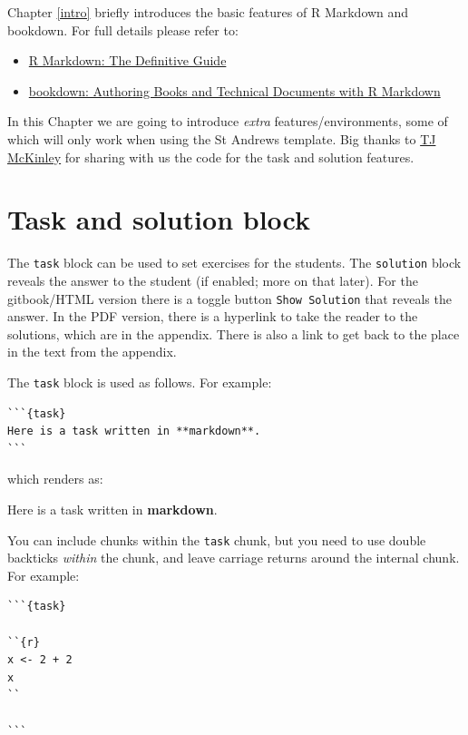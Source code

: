 \documentclass[
  british,
  oneside]{krantz}
\providecommand{\tightlist}{%
  \setlength{\itemsep}{0pt}\setlength{\parskip}{0pt}}
\newcommand{\bblockT}[2][Task]{\begin{tcolorbox}[title = #1 #2, parbox = false]}
\newcommand{\eblockT}{\end{tcolorbox}}
\theoremstyle{definition}
\theoremstyle{definition}
\theoremstyle{definition}
\theoremstyle{definition}
\theoremstyle{remark}
\begin{document}
Chapter \ref{intro} briefly introduces the basic features of R Markdown and bookdown. For full details please refer to:

\begin{itemize}
\tightlist
\item
  \href{https://bookdown.org/yihui/rmarkdown/}{R Markdown: The Definitive Guide}
\item
  \href{https://bookdown.org/yihui/bookdown/}{bookdown: Authoring Books and Technical Documents with R Markdown}
\end{itemize}

In this Chapter we are going to introduce \emph{extra} features/environments, some of which will only work when using the St Andrews template. Big thanks to \href{https://github.com/tjmckinley/RtutorialSkeleton}{TJ McKinley} for sharing with us the code for the task and solution features.

\hypertarget{task-and-solution-block}{%
\section{Task and solution block}\label{task-and-solution-block}}

The \texttt{task} block can be used to set exercises for the students. The \texttt{solution} block reveals the answer to the student (if enabled; more on that later). For the gitbook/HTML version
there is a toggle button \texttt{Show\ Solution} that reveals the answer. In the PDF version, there is a hyperlink to take the reader to the solutions, which are in the appendix. There is also a link to get back to the place in the text from the appendix.

The \texttt{task} block is used as follows. For example:

\begin{verbatim}
```{task}
Here is a task written in **markdown**.
```
\end{verbatim}

which renders as:

\hypertarget{tsk1}{}\bblockT[Task]{\phantomsection\label{sol1}1}

Here is a task written in \textbf{markdown}.
\eblockT

You can include chunks within the \texttt{task} chunk, but you need to use double backticks \emph{within} the chunk, and leave carriage returns around the internal chunk. For example:

\begin{verbatim}
```{task}

``{r}
x <- 2 + 2
x
``

```
\end{verbatim}
\end{document}
